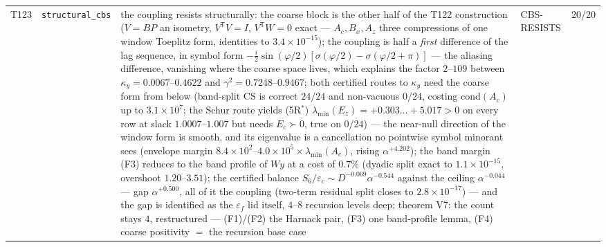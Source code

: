\documentclass[11pt,a4paper]{article}
\begin{document}
{\begin{xltabular}{\linewidth}{@{}p{0.95cm} >{\raggedright\arraybackslash}p{3.1cm} Y >{\raggedright\scriptsize\arraybackslash}p{3.35cm} p{1.15cm}@{}}
T123 & \texttt{\scriptsize structural\_\allowbreak cbs} & the coupling resists structurally: the coarse block is the other half of the T122 construction ($V=BP$ an isometry, $V^{\mathsf T}V=I$, $V^{\mathsf T}W=0$ exact --- $A_c,B_x,A_z$ three compressions of one window Toeplitz form, identities to $3.4\times10^{-15}$); the coupling is half a \emph{first} difference of the lag sequence, in symbol form $-\tfrac{i}{2}\sin(\varphi/2)[\sigma(\varphi/2)-\sigma(\varphi/2+\pi)]$ --- the aliasing difference, vanishing where the coarse space lives, which explains the factor $2$--$109$ between $\kappa_y=0.0067$--$0.4622$ and $\gamma^2=0.7248$--$0.9467$; both certified routes to $\kappa_y$ need the coarse form from below (band-split CS is correct $24/24$ and non-vacuous $0/24$, costing $\mathrm{cond}(A_c)$ up to $3.1\times10^{7}$; the Schur route yields (5R$^*$) $\lambda_{\min}(E_z)=+0.303\ldots+5.017>0$ on every row at slack $1.0007$--$1.007$ but needs $E_c\succ0$, true on $0/24$) --- the near-null direction of the window form is smooth, and its eigenvalue is a cancellation no pointwise symbol minorant sees (envelope margin $8.4\times10^{2}$--$4.0\times10^{5}\times\lambda_{\min}(A_c)$, rising $\alpha^{+4.202}$); the band margin (F3) reduces to the band profile of $Wy$ at a cost of $0.7\%$ (dyadic split exact to $1.1\times10^{-15}$, overshoot $1.20$--$3.51$); the certified balance $S_6/\varepsilon_c\sim D^{-0.069}\alpha^{-0.544}$ against the ceiling $\alpha^{-0.044}$ --- gap $\alpha^{+0.500}$, all of it the coupling (two-term residual split closes to $2.8\times10^{-17}$) --- and the gap is identified as the $\varepsilon_f$ lid itself, $4$--$8$ recursion levels deep; theorem V7: the count stays $4$, restructured --- (F1)/(F2) the Harnack pair, (F3) one band-profile lemma, (F4) coarse positivity $=$ the recursion base case & CBS-RESISTS & 20/20\\

\end{xltabular}}
\end{document}
